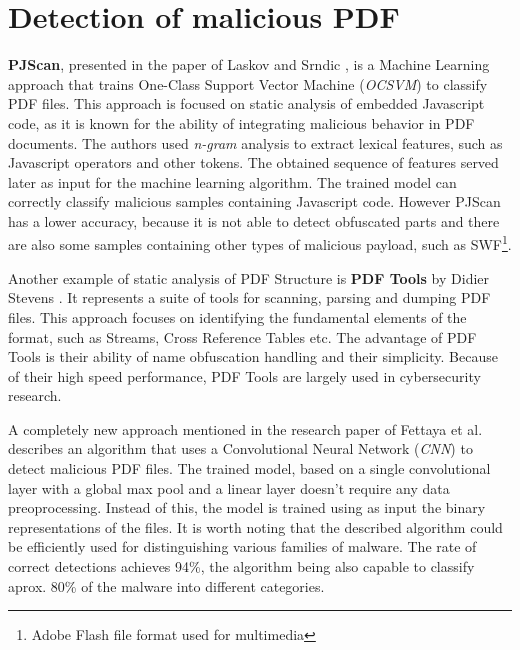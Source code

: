 

\section{Detection of malicious PDF}
\label{section:relatedWorkML}
\textbf{PJScan}, presented in the paper of Laskov and Srndic \cite{pjscan}, is a Machine Learning approach that trains One-Class Support Vector Machine (\textit{OCSVM}) to classify PDF files. This approach is focused on static analysis of embedded Javascript code, as it is known for the ability of integrating malicious behavior in PDF documents. The authors used \textit{n-gram} analysis to extract lexical features, such as Javascript operators and other tokens. The obtained sequence of features served later as input for the machine learning algorithm. The trained model can correctly classify malicious samples containing Javascript code. However PJScan has a lower accuracy, because it is not able to detect obfuscated parts and there are also some samples containing other types of malicious payload, such as SWF\footnote{Adobe Flash file format used for multimedia}. \par
Another example of static analysis of PDF Structure is \textbf{PDF Tools} by Didier Stevens \cite{pdftools}. It represents a suite of tools for scanning, parsing and dumping PDF files. This approach focuses on identifying the fundamental elements of the format, such as Streams, Cross Reference Tables etc. The advantage of PDF Tools is their ability of name obfuscation handling and their simplicity. Because of their high speed performance, PDF Tools are largely used in cybersecurity research. \par
A completely new approach mentioned in the research paper of Fettaya et al. \cite{deepdf} describes an algorithm that uses a Convolutional Neural Network (\textit{CNN}) to detect malicious PDF files. The trained model, based on a single convolutional layer with a global max pool and a linear layer doesn't require any data preoprocessing. Instead of this, the model is trained using as input the binary representations of the files. It is worth noting that the described algorithm could be efficiently used for distinguishing various families of malware. The rate of correct detections achieves 94\%, the algorithm being also capable to classify aprox. 80\% of the malware into different categories.